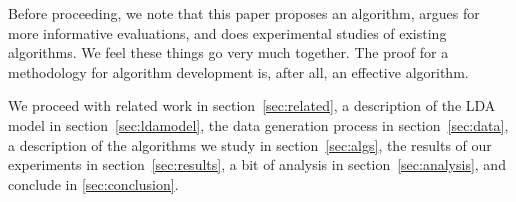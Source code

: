 
Before proceeding, we note that this paper proposes an algorithm,
argues for more informative evaluations, and does experimental studies
of existing algorithms.  We feel these things go very much together.  The
proof for a methodology for algorithm development is, after all, an
effective algorithm.

We proceed with related work in section~\ref{sec:related}, a
description of the LDA model in section~\ref{sec:ldamodel}, the data
generation process in section~\ref{sec:data}, a description of the
algorithms we study in section~\ref{sec:algs}, the results of our
experiments in section~\ref{sec:results}, a bit of analysis in
section~\ref{sec:analysis}, and conclude in \ref{sec:conclusion}.

